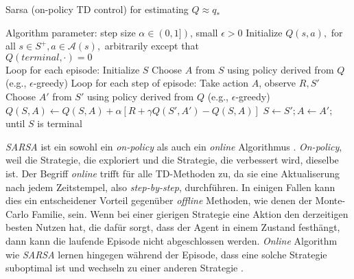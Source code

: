\begin{algorithm}
    \caption{Sarsa (on-policy TD control) for estimating $Q \approx q_*$}
    \begin{algorithmic}[1]
        \State Algorithm parameter: step size $\alpha \in (0,1])$, small $\epsilon > 0$
        \State Initialize $Q(s,a),$ for all $s \in S^+, a \in \mathcal{A}(s),$ arbitrarily except that \\ $Q(terminal, \mathord{\cdot}) = 0$
        \\
        \State Loop for each episode:
        \Indent
            \State Initialize $S$
            \State Choose $A$ from $S$ using policy derived from $Q$ (e.g., $\epsilon$-greedy)
            \State Loop for each step of episode:
            \Indent
                \State Take action $A$, observe $R, S'$
                \State Choose $A'$ from $S'$ using policy derived from $Q$ (e.g., $\epsilon$-greedy)
                \State $Q(S,A) \gets Q(S,A) + \alpha [R + \gamma Q(S',A') - Q(S,A)]$
                \State $S \gets S'; A \gets A';$
            \EndIndent
            \State until $S$ is terminal
        \EndIndent 
    \end{algorithmic}
\end{algorithm}
\par 
\textit{SARSA} ist ein sowohl ein \textit{on-policy} als auch ein \textit{online} Algorithmus \cite[S.~129f]{Sutton1998}. \textit{On-policy}, weil die Strategie, die exploriert und die Strategie, die verbessert wird, dieselbe ist. Der Begriff \textit{online} trifft für alle TD-Methoden zu, da sie eine Aktualiserung nach jedem Zeitstempel, also \textit{step-by-step}, durchführen. In einigen Fallen kann dies ein entscheidener Vorteil gegenüber \textit{offline} Methoden, wie denen der Monte-Carlo Familie, sein. Wenn bei einer gierigen Strategie eine Aktion den derzeitigen besten Nutzen hat, die dafür sorgt, dass der Agent in einem Zustand festhängt, dann kann die laufende Episode nicht abgeschlossen werden. \textit{Online} Algorithm wie \textit{SARSA} lernen hingegen während der Episode, dass eine solche Strategie suboptimal ist und wechseln zu einer anderen Strategie \cite[S.~130]{Sutton1998}.
\pagebreak
